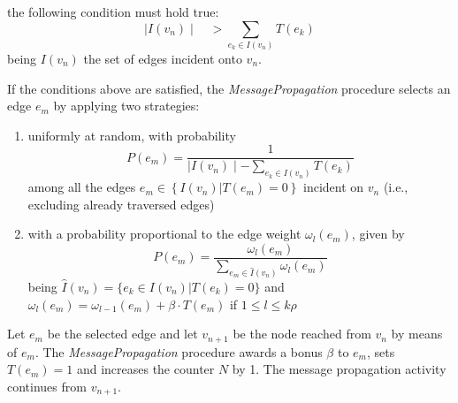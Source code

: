 {\begin{itemize}
\begin{equation}
	\end{equation}
	the following condition must hold true:
	\begin{equation}
	\mid I(v_n) \mid \quad > \sum\limits_{e_k \in I(v_n)} T(e_k)
	\end{equation}
	being $I(v_n)$ the set of edges incident onto $v_n$.
\end{itemize}
If the conditions above are satisfied, the \textit{MessagePropagation} procedure selects an edge $e_m$ by applying two strategies:
\begin{enumerate}[label=\alph*.]
	\item uniformly at random, with probability
	\begin{equation}
	P(e_m) = \dfrac{1}{\mid I(v_n) \mid - \sum\limits_{e_k \in I(v_n)} T(e_k)}
	\end{equation}
	among all the edges $e_m \in \left\{ I(v_n) | T(e_m) = 0\right\}$ incident on $v_n$ (i.e., excluding already traversed edges)
	\item with a probability proportional to the edge weight $\omega_l (e_m)$, given by
	\begin{equation}\label{probability-edge-weight}
	P(e_m) = \dfrac{\omega_l (e_m)}{\sum\limits_{e_m \in \hat{I}(v_n)} \omega_l (e_m)}
	\end{equation}
	being $\hat{I}(v_n) = \{e_k \in I(v_n) | T(e_k) = 0\}$ and $\omega_l (e_m) = \omega_{l-1} (e_m) + \beta \cdot T(e_m)$ if $1 \le l \le k\rho$
\end{enumerate}
Let $e_m$ be the selected edge and let $v_{n+1}$ be the node reached from $v_n$ by means of $e_m$. The \textit{MessagePropagation} procedure awards a bonus $\beta$ to $e_m$, sets $T(e_m) = 1$ and increases the counter $N$ by 1. The message propagation activity continues from $v_{n+1}$.

}

